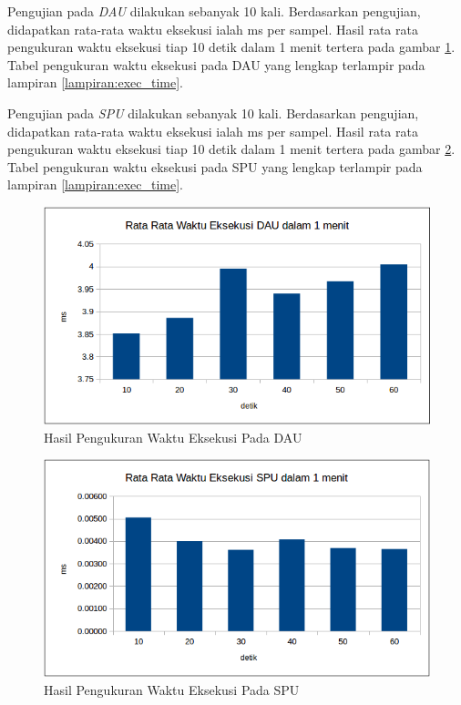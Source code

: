 Pengujian pada \textit{DAU} dilakukan sebanyak 10 kali. Berdasarkan pengujian, didapatkan rata-rata waktu eksekusi ialah \exec ms per sampel. Hasil rata rata pengukuran waktu eksekusi tiap 10 detik dalam 1 menit tertera pada gambar \ref{fig:exec_time}. Tabel pengukuran waktu eksekusi pada DAU yang lengkap terlampir pada lampiran \ref{lampiran:exec_time}.

Pengujian pada \textit{SPU} dilakukan sebanyak 10 kali. Berdasarkan pengujian, didapatkan rata-rata waktu eksekusi ialah \execs ms per sampel. Hasil rata rata pengukuran waktu eksekusi tiap 10 detik dalam 1 menit tertera pada gambar \ref{fig:exec_time2}. Tabel pengukuran waktu eksekusi pada SPU yang lengkap terlampir pada lampiran \ref{lampiran:exec_time}.

\begin{figure}[H]
	\centering
	\includegraphics[scale=0.5]{images/exec_time1.png}
	\caption{Hasil Pengukuran Waktu Eksekusi Pada DAU}
	\label{fig:exec_time}
\end{figure}

\begin{figure}[H]
	\centering
	\includegraphics[scale=0.5]{images/exec_time2.png}
	\caption{Hasil Pengukuran Waktu Eksekusi Pada SPU}
	\label{fig:exec_time2}
\end{figure}

